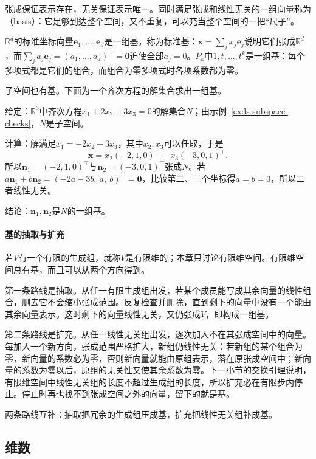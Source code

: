 张成保证表示存在，无关保证表示唯一。同时满足张成和线性无关的一组向量称为（basis）：它足够到达整个空间，又不重复，可以充当整个空间的一把“尺子”。

$\mathbb R^d$的标准坐标向量$\bm e_1,\ldots,\bm e_d$是一组基，称为标准基：$\bm x=\sum_jx_j\bm e_j$说明它们张成$\mathbb R^d$，而$\sum_ja_j\bm e_j=(a_1,\ldots,a_d)^\top=\bm0$迫使全部$a_j=0$。$P_k$中$1,t,\ldots,t^k$是一组基：每个多项式都是它们的组合，而组合为零多项式时各项系数都为零。

子空间也有基。下面为一个齐次方程的解集合求出一组基。
\begin{example}[齐次方程解平面的一组基]
\label{ex:ls-solution-plane-basis}
给定：$\mathbb R^3$中齐次方程$x_1+2x_2+3x_3=0$的解集合$N$；由示例~\ref{ex:ls-subspace-checks}，$N$是子空间。

计算：解满足$x_1=-2x_2-3x_3$，其中$x_2,x_3$可以任取，于是
\[
 \bm x=x_2(-2,1,0)^\top+x_3(-3,0,1)^\top .
\]
所以$\bm n_1=(-2,1,0)^\top$与$\bm n_2=(-3,0,1)^\top$张成$N$。若$a\bm n_1+b\bm n_2=(-2a-3b,\ a,\ b)^\top=\bm0$，比较第二、三个坐标得$a=b=0$，所以二者线性无关。

结论：$\bm n_1,\bm n_2$是$N$的一组基。
\end{example}

\paragraph{基的抽取与扩充}
若$V$有一个有限的生成组，就称$V$是有限维的；本章只讨论有限维空间。有限维空间总有基，而且可以从两个方向得到。

第一条路线是抽取。从任一有限生成组出发，若某个成员能写成其余向量的线性组合，删去它不会缩小张成范围。反复检查并删除，直到剩下的向量中没有一个能由其余向量表示。这时剩下的向量线性无关，又仍张成$V$，即构成一组基。

第二条路线是扩充。从任一线性无关组出发，逐次加入不在其张成空间中的向量。每加入一个新方向，张成范围严格扩大，新组仍线性无关：若新组的某个组合为零，新向量的系数必为零，否则新向量就能由原组表示，落在原张成空间中；新向量的系数为零以后，原组的无关性又使其余系数为零。下一小节的交换引理说明，有限维空间中线性无关组的长度不超过生成组的长度，所以扩充必在有限步内停止。停止时再也找不到张成空间之外的向量，留下的就是基。

两条路线互补：抽取把冗余的生成组压成基，扩充把线性无关组补成基。

\subsection{维数}
\label{sec:ls-dimension}

